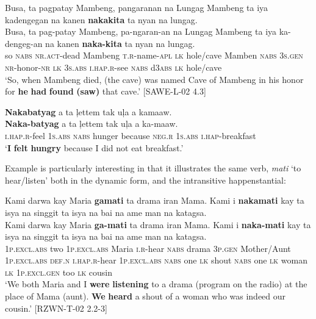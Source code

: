 \ea
Busa,  ta  pagpatay  Mambeng,  pangaranan  na  Lungag  Mambeng ta  iya  kadengegan  na  kanen  \textbf{nakakita}  ta  nyan  na  lungag. \\\smallskip
 \gll Busa,  ta  pag-patay  Mambeng,  pa-ngaran-an  na  Lungag  Mambeng ta  iya  ka-dengeg-an  na  kanen  \textbf{naka-kita}  ta  nyan  na  lungag. \\
so  \textsc{nabs}  \textsc{nr.act}-dead  Mambeng  \textsc{t.r}-name-\textsc{apl}  \textsc{lk}  hole/cave  Mamben
\textsc{nabs} 3\textsc{s.gen}  \textsc{nr}-honor-\textsc{nr}  \textsc{lk}  3\textsc{s.abs}  \textsc{i.hap.r}-see  \textsc{nabs}  d3\textsc{abs}  \textsc{lk}  hole/cave \\
\glt `So, when Mambeng died, (the cave) was named Cave of Mambeng in his honor for \textbf{he} \textbf{had} \textbf{found} \textbf{(saw)} that cave.’ [SAWE-L-02 4.3]
\z

\ea
\textbf{Nakabatyag}  a  ta  ļettem  tak  uļa  a  kamaaw. \\\smallskip
 \gll \textbf{Naka-batyag}  a  ta  ļettem  tak  uļa  a  ka-maaw. \\
\textsc{i.hap.r}-feel  1\textsc{s.abs}  \textsc{nabs}  hunger  because  \textsc{neg.r}  1\textsc{s.abs}  \textsc{i.hap}-breakfast \\
\glt ‘\textbf{I} \textbf{felt} \textbf{hungry} because I did not eat breakfast.’
\z

Example  is particularly interesting in that it illustrates the same verb, \textit{mati} ‘to hear/listen’ both in the dynamic form, and the intransitive happenstantial:

\ea
\label{bkm:Ref447897963}
Kami  darwa  kay  Maria  \textbf{gamati}  ta  drama  iran  Mama. Kami  i  \textbf{nakamati}  kay  ta  isya  na  singgit  ta  isya na  bai  na  ame  man  na  katagsa. \\\smallskip
 \gll Kami  darwa  kay  Maria  \textbf{ga-mati}  ta  drama  iran  Mama. Kami  i  \textbf{naka-mati}  kay  ta  isya  na  singgit  ta  isya na  bai  na  ame  man  na  katagsa. \\
1\textsc{p.excl.abs}  two  1\textsc{p.excl.abs}  Maria  \textsc{i.r}-hear  \textsc{nabs}  drama  3\textsc{p.gen}  Mother/Aunt
1\textsc{p.excl.abs}  \textsc{def.n}  \textsc{i.hap.r}-hear  1\textsc{p.excl.abs}  \textsc{nabs}  one  \textsc{lk}  shout  \textsc{nabs}  one
\textsc{lk}  woman  \textsc{lk}  1\textsc{p.excl.gen}  too  \textsc{lk}  cousin \\
\glt `We both Maria and I \textbf{were} \textbf{listening} to a drama (program on the radio) at the place of Mama (aunt). \textbf{We} \textbf{heard} a shout of a woman who was indeed our cousin.’ [RZWN-T-02 2.2-3]
\z

